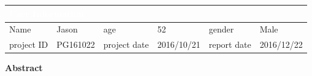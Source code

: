 \documentclass[UTF8]{article}
\begin{document}

\begin{center}
\sffamily
{}
\arrayrulewidth=1pt
\renewcommand{\arraystretch}{1.5}


\begin{table}[htbp]
\centering
\large
\begin{tabular}{|m{2.3cm}|m{2.5cm}|m{2.8cm}|m{2.2cm}|m{2.6cm}|m{2.2cm}|}
 \multicolumn{6}{H}{\textcolor{white}{\bfseries User Information}}\\
 \hline
 \textcolor{myBlue}{Name}&Jason&\textcolor{myBlue}{age}&52&\textcolor{myBlue}{gender}&Male\\
 \hline
 \textcolor{myBlue}{project ID}&PG161022&\textcolor{myBlue}{project date}&2016/10/21&\textcolor{myBlue}{report date}&2016/12/22\\
 \hline
\end{tabular}
\end{table}
\end{center}

\begin{table}[htbp]
\normalsize
\centering
\begin{multicols}{3}  
    \end{multicols}
\end{table}

\begin{center}
\LARGE
\textcolor{myBlue}{\bfseries Abstract}
\end{center}
\end{document}
